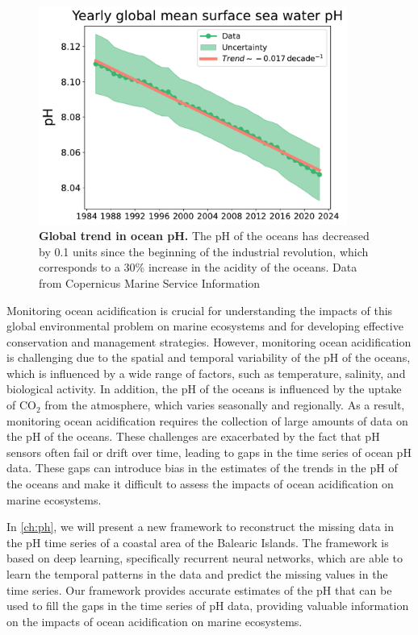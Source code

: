 \begin{figure}[H]
  \centering
  \includegraphics[width=0.9\textwidth]{Figures/Ocean_acidification.pdf}
  \caption[Global trend in ocean pH]{
    \textbf{Global trend in ocean pH.} The pH of the oceans has decreased by
    0.1 units since the beginning of the industrial revolution, which
    corresponds to a 30\% increase in the acidity of the oceans. Data from
    Copernicus Marine Service Information \cite{CMEMS2024}}
  \label{fig:Ocean_acidification}
\end{figure}

Monitoring ocean acidification is crucial for understanding the impacts of
this global environmental problem on marine ecosystems and for developing
effective conservation and management strategies. However, monitoring ocean
acidification is challenging due to the spatial and temporal variability of
the pH of the oceans, which is influenced by a wide range of factors, such as
temperature, salinity, and biological activity. In addition, the pH of the
oceans is influenced by the uptake of CO$_2$ from the atmosphere, which
varies seasonally and regionally. As a result, monitoring ocean acidification
requires the collection of large amounts of data on the pH of the oceans.
These challenges are exacerbated by the fact that pH sensors often fail or
drift over time, leading to gaps in the time series of ocean pH data. These
gaps can introduce bias in the estimates of the trends in the pH of the oceans
and make it difficult to assess the impacts of ocean acidification on marine
ecosystems.

In \cref{ch:ph}, we will present a new framework to reconstruct the missing
data in the pH time series of a coastal area of the Balearic Islands.
The framework is based on deep learning, specifically recurrent neural
networks, which are able to learn the temporal patterns in the data and predict
the missing values in the time series. Our framework provides accurate
estimates of the pH that can be used to fill the gaps in the time series of pH
data, providing valuable information on the impacts of ocean acidification on
marine ecosystems.